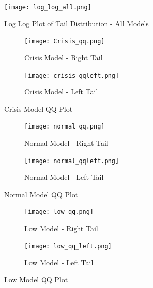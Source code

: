 \documentclass[11pt,a4paper,oldfontcommands]{memoir}
\begin{document}
{%





\begin{figure}[h]
\caption{Log Log Plot of Tail Distribution - All Models}
\texttt{[image: log\_log\_all.png]} 
\centering
\label{}
\end{figure}



\begin{figure}[H]
\centering
\begin{subfigure}{.5\textwidth}
  \centering
  \texttt{[image: Crisis\_qq.png]}
  \caption{Crisis Model - Right Tail}
  \label{fig:sub1}
\end{subfigure}%
\begin{subfigure}{.5\textwidth}
  \centering
  \texttt{[image: crisis\_qqleft.png]}
  \caption{Crisis Model - Left Tail}
  \label{fig:sub2}
\end{subfigure}
\caption{Crisis Model QQ Plot}
\label{fig:crisisqq}
\end{figure}


\begin{figure}[H]
\centering
\begin{subfigure}{.5\textwidth}
  \centering
  \texttt{[image: normal\_qq.png]}
  \caption{Normal Model - Right Tail}
  \label{fig:sub1}
\end{subfigure}%
\begin{subfigure}{.5\textwidth}
  \centering
  \texttt{[image: normal\_qqleft.png]}
  \caption{Normal Model - Left Tail}
  \label{fig:sub2}
\end{subfigure}
\caption{Normal Model QQ Plot}
\label{fig:normalqq}
\end{figure}


\begin{figure}[H]
\centering
\begin{subfigure}{.5\textwidth}
  \centering
  \texttt{[image: low\_qq.png]}
  \caption{Low Model - Right Tail}
  \label{fig:sub1}
\end{subfigure}%
\begin{subfigure}{.5\textwidth}
  \centering
  \texttt{[image: low\_qq\_left.png]}
  \caption{Low Model - Left Tail}
  \label{fig:sub2}
\end{subfigure}
\caption{Low Model QQ Plot}
\label{fig:lowqq}
\end{figure}


}
\end{document}
